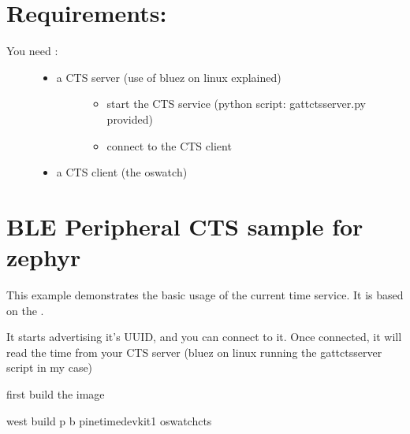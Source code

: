 \documentclass[letterpaper,10pt,english]{sphinxmanual}
\begin{document}
\section{Requirements:}
\label{\detokenize{current-time:requirements}}\begin{description}
\item[{You need :}] \leavevmode\begin{itemize}
\item {} \begin{description}
\item[{a CTS server (use of bluez on linux explained)}] \leavevmode\begin{itemize}
\item {} 
start the CTS service (python script: gatt\sphinxhyphen{}cts\sphinxhyphen{}server.py provided)

\item {} 
connect to the CTS client

\end{itemize}

\end{description}

\item {} 
a CTS client (the oswatch)

\end{itemize}

\end{description}


\section{BLE Peripheral CTS sample for zephyr}
\label{\detokenize{current-time:ble-peripheral-cts-sample-for-zephyr}}
This example demonstrates the basic usage of the current time service.
It is based on the .

It starts advertising it’s UUID, and you can connect to it.
Once connected, it will read the time from your CTS server
(bluez on linux running the gatt\sphinxhyphen{}cts\sphinxhyphen{}server script in my case)

first build the image

\begin{sphinxVerbatim}[commandchars=\\\{\}]
  west build \PYGZhy{}p \PYGZhy{}b pinetime\PYGZus{}devkit1 oswatch\PYGZhy{}cts
\end{sphinxVerbatim}
\end{document}
